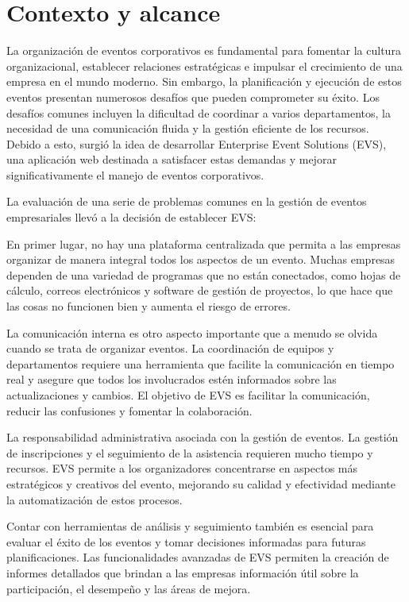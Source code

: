 \section{Contexto y alcance}

La organización de eventos corporativos es fundamental para fomentar la cultura organizacional, 
establecer relaciones estratégicas e impulsar el crecimiento de una empresa en el mundo moderno. 
Sin embargo, la planificación y ejecución de estos eventos presentan numerosos desafíos que pueden comprometer su éxito. 
Los desafíos comunes incluyen la dificultad de coordinar a varios departamentos, la necesidad de una comunicación fluida y 
la gestión eficiente de los recursos. Debido a esto, surgió la idea de desarrollar Enterprise Event Solutions (EVS), una aplicación web destinada a satisfacer estas 
demandas y mejorar significativamente el manejo de eventos corporativos.

La evaluación de una serie de problemas comunes en la gestión de eventos empresariales llevó a la decisión de establecer EVS:

En primer lugar, no hay una plataforma centralizada que permita a las empresas organizar de manera integral todos los aspectos de un evento. 
Muchas empresas dependen de una variedad de programas que no están conectados, como hojas de cálculo, correos electrónicos y software de gestión de 
proyectos, lo que hace que las cosas no funcionen bien y aumenta el riesgo de errores.

La comunicación interna es otro aspecto importante que a menudo se olvida cuando se trata de organizar eventos. La coordinación de equipos y 
departamentos requiere una herramienta que facilite la comunicación en tiempo real y asegure que todos los involucrados estén informados sobre las 
actualizaciones y cambios. El objetivo de EVS es facilitar la comunicación, reducir las confusiones y fomentar la colaboración.

La responsabilidad administrativa asociada con la gestión de eventos. 
La gestión de inscripciones y el seguimiento de 
la asistencia requieren mucho tiempo y recursos. EVS permite a los organizadores 
concentrarse en aspectos más estratégicos y creativos del evento, mejorando su calidad y 
efectividad mediante la automatización de estos procesos.

Contar con herramientas de análisis y seguimiento también es esencial para evaluar el éxito de los eventos y tomar 
decisiones informadas para futuras planificaciones. Las funcionalidades avanzadas de EVS permiten la creación de informes 
detallados que brindan a las empresas información útil sobre la participación, el desempeño y las áreas de mejora.


